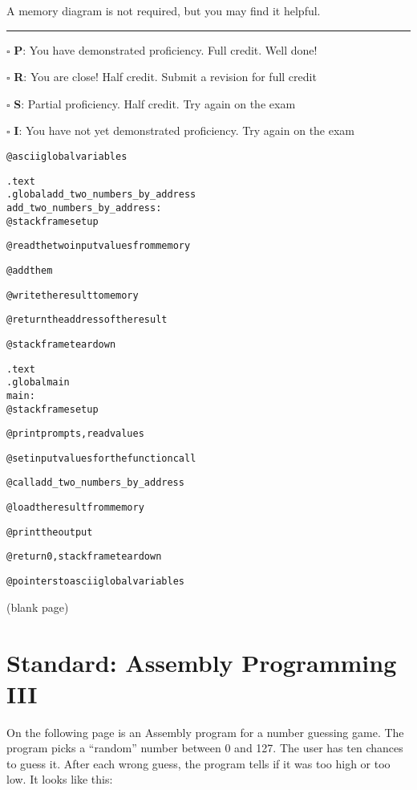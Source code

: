 \documentclass[12pt]{article}
\begin{document}
A memory diagram is not required, but you may find it helpful.

\vfill

\rule[1ex]{\textwidth}{.1pt}

$\square$ \textbf{P}: You have demonstrated proficiency. Full credit. Well done!

$\square$ \textbf{R}: You are close! Half credit. Submit a revision for full credit

$\square$ \textbf{S}: Partial proficiency. Half credit. Try again on the exam

$\square$ \textbf{I}: You have not yet demonstrated proficiency. Try again on the exam

\newpage

\begin{alltt}
@ ascii global variables

    .text
    .global add_two_numbers_by_address
add_two_numbers_by_address:
    @ stack frame setup

    @ read the two input values from memory

    @ add them
    
    @ write the result to memory

    @ return the address of the result

    @ stack frame teardown

    .text
    .global main
main: 
    @ stack frame setup

    @ print prompts, read values

    @ set input values for the function call

    @ call add_two_numbers_by_address

    @ load the result from memory

    @ print the output

    @ return 0, stack frame teardown

@ pointers to ascii global variables
\end{alltt}

\newpage

\begin{center}
(blank page)
\end{center}

\newpage

\section*{Standard: Assembly Programming III}

On the following page is an Assembly program for a number guessing game. The program picks a ``random'' number between 0 and 127. The user has ten chances to guess it. After each wrong guess, the program tells if it was too high or too low. It looks like this:
\end{document}
